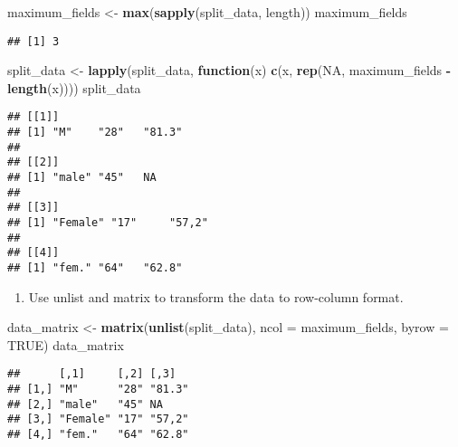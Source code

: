 \documentclass[
]{article}
\newenvironment{Shaded}{\begin{snugshade}}{\end{snugshade}}
\newcommand{\AttributeTok}[1]{\textcolor[rgb]{0.13,0.29,0.53}{#1}}
\newcommand{\ConstantTok}[1]{\textcolor[rgb]{0.56,0.35,0.01}{#1}}
\newcommand{\ControlFlowTok}[1]{\textcolor[rgb]{0.13,0.29,0.53}{\textbf{#1}}}
\newcommand{\FunctionTok}[1]{\textcolor[rgb]{0.13,0.29,0.53}{\textbf{#1}}}
\newcommand{\NormalTok}[1]{#1}
\newcommand{\OtherTok}[1]{\textcolor[rgb]{0.56,0.35,0.01}{#1}}
\newcommand{\SpecialCharTok}[1]{\textcolor[rgb]{0.81,0.36,0.00}{\textbf{#1}}}
\providecommand{\tightlist}{%
  \setlength{\itemsep}{0pt}\setlength{\parskip}{0pt}}
\begin{document}
\begin{Shaded}
\begin{Highlighting}[]
\NormalTok{maximum\_fields }\OtherTok{\textless{}{-}} \FunctionTok{max}\NormalTok{(}\FunctionTok{sapply}\NormalTok{(split\_data, length))}
\NormalTok{maximum\_fields}
\end{Highlighting}
\end{Shaded}

\begin{verbatim}
## [1] 3
\end{verbatim}

\begin{Shaded}
\begin{Highlighting}[]
\NormalTok{split\_data }\OtherTok{\textless{}{-}} \FunctionTok{lapply}\NormalTok{(split\_data, }\ControlFlowTok{function}\NormalTok{(x) }\FunctionTok{c}\NormalTok{(x, }\FunctionTok{rep}\NormalTok{(}\ConstantTok{NA}\NormalTok{, maximum\_fields }\SpecialCharTok{{-}} \FunctionTok{length}\NormalTok{(x))))}
\NormalTok{split\_data}
\end{Highlighting}
\end{Shaded}

\begin{verbatim}
## [[1]]
## [1] "M"    "28"   "81.3"
## 
## [[2]]
## [1] "male" "45"   NA    
## 
## [[3]]
## [1] "Female" "17"     "57,2"  
## 
## [[4]]
## [1] "fem." "64"   "62.8"
\end{verbatim}

\begin{enumerate}
\def\labelenumi{\alph{enumi}.}
\setcounter{enumi}{2}
\tightlist
\item
  Use unlist and matrix to transform the data to row-column format.
\end{enumerate}

\begin{Shaded}
\begin{Highlighting}[]
\NormalTok{data\_matrix }\OtherTok{\textless{}{-}} \FunctionTok{matrix}\NormalTok{(}\FunctionTok{unlist}\NormalTok{(split\_data), }\AttributeTok{ncol =}\NormalTok{ maximum\_fields, }\AttributeTok{byrow =} \ConstantTok{TRUE}\NormalTok{)}
\NormalTok{data\_matrix}
\end{Highlighting}
\end{Shaded}

\begin{verbatim}
##      [,1]     [,2] [,3]  
## [1,] "M"      "28" "81.3"
## [2,] "male"   "45" NA    
## [3,] "Female" "17" "57,2"
## [4,] "fem."   "64" "62.8"
\end{verbatim}
\end{document}
